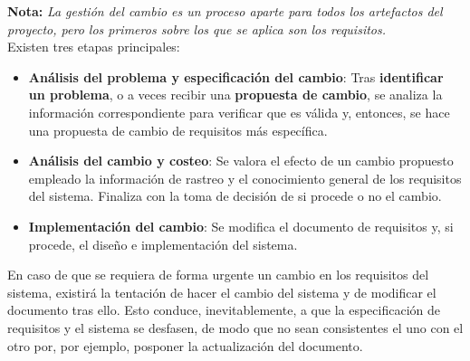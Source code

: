 \textbf{Nota:} \textit{La gestión del cambio es un proceso aparte para todos los artefactos del proyecto, pero los primeros sobre los que se aplica son los requisitos.}\\

Existen tres etapas principales:

\begin{itemize}
    \item \textbf{Análisis del problema y especificación del cambio}: Tras \textbf{identificar un problema}, o a veces recibir una \textbf{propuesta de cambio}, se analiza la información correspondiente para verificar que es válida y, entonces, se hace una propuesta de cambio de requisitos más específica.
    \item \textbf{Análisis del cambio y costeo}: Se valora el efecto de un cambio propuesto empleado la información de rastreo y el conocimiento general de los requisitos del sistema. Finaliza con la toma de decisión de si procede o no el cambio.
    \item \textbf{Implementación del cambio}: Se modifica el documento de requisitos y, si procede, el diseño e implementación del sistema.
\end{itemize}

En caso de que se requiera de forma urgente un cambio en los requisitos del sistema, existirá la tentación de hacer el cambio del sistema y de modificar el documento tras ello. Esto conduce, inevitablemente, a que la especificación de requisitos y el sistema se desfasen, de modo que no sean consistentes el uno con el otro por, por ejemplo, posponer la actualización del documento.
